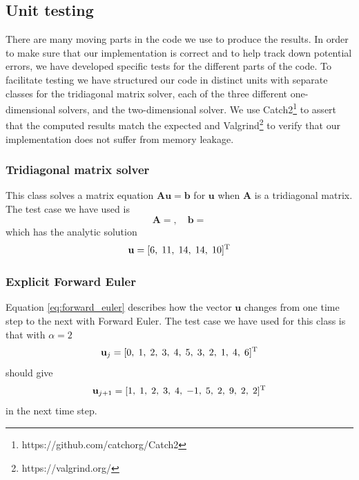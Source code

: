 \documentclass[reprint, english,notitlepage,nofootinbib]{revtex4-1}  %
\newcommand{\vc}[1]{\mathbf{#1}}
\begin{document}
\subsection{Unit testing}

There are many moving parts in the code we use to produce the results. In order to make sure that our implementation is correct and to help track down potential errors, we have developed specific tests for the different parts of the code. To facilitate testing we have structured our code in distinct units with separate classes for the tridiagonal matrix solver, each of the three different one-dimensional solvers, and the two-dimensional solver. We use Catch2\footnote{https://github.com/catchorg/Catch2} to assert that the computed results match the expected and Valgrind\footnote{https://valgrind.org/} to verify that our implementation does not suffer from memory leakage.

\subsubsection*{Tridiagonal matrix solver}

This class solves a matrix equation $\vc A \vc u = \vc b$ for $\vc u$ when $\vc A$ is a tridiagonal matrix. The test case we have used is
\begin{equation*}
  \vc A =
  , \quad
  \vc b =
  
\end{equation*}
which has the analytic solution
\begin{equation*}
  \vc u = [6, \; 11, \; 14, \; 14, \; 10]^{\text T}
\end{equation*}

\subsubsection*{Explicit Forward Euler}

Equation \eqref{eq:forward_euler} describes how the vector $\vc u$ changes from one time step to the next with Forward Euler. The test case we have used for this class is that with \(\alpha = 2\)
\begin{equation*}
  \vc u_j = [0, \; 1, \; 2, \; 3, \; 4, \; 5, \; 3, \; 2, \; 1, \; 4, \; 6]^{\text T}
\end{equation*}
should give
\begin{equation*}
  \vc u_{j+1} = [1, \; 1, \; 2, \; 3, \; 4, \; -1, \; 5, \; 2, \; 9, \; 2, \; 2]^{\text T}
\end{equation*}
in the next time step.
\end{document}
